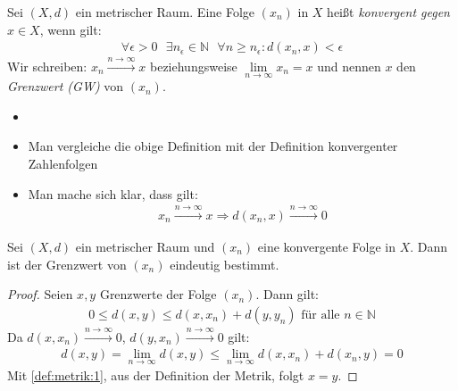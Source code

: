 
\begin{Definition}{%
	Sei $(X,d)$ ein metrischer Raum. Eine Folge $(x_n)$ in $X$ heißt 
	\emph{konvergent gegen} $x \in X$, wenn gilt:
	\begin{align*}
		\forall \epsilon > 0 \text{ } \exists n_\epsilon \in \mathbb{N} \text{ }
		\forall n \geq n_\epsilon : d(x_n, x) < \epsilon
	\end{align*}
	Wir schreiben: $x_n \overset{n\rightarrow \infty}{\longrightarrow} x$ 
	beziehungsweise $\lim\limits_{n \rightarrow \infty}{x_n} = x$ und nennen 
	$x$ den \emph{Grenzwert (GW)} von $(x_n)$. 
}\end{Definition}

\begin{Bemerkung}{
	\begin{itemize}
		\item[ ]
		\item Man vergleiche die obige Definition mit der Definition konvergenter 
		 Zahlenfolgen
		 \item Man mache sich klar, dass gilt:
		 \begin{align*}
		 	x_n \xrightarrow{n \rightarrow \infty} x \Longrightarrow 
		 	d(x_n, x) \xrightarrow{n \rightarrow \infty} 0
		 \end{align*}
	\end{itemize}
}\end{Bemerkung}

\begin{Lemma}{%
	Sei $(X,d)$ ein metrischer Raum und $(x_n)$ eine konvergente Folge in $X$. 
	Dann ist der Grenzwert von $(x_n)$ eindeutig bestimmt.
}\end{Lemma}

\begin{proof}
	Seien $x,y$ Grenzwerte der Folge $(x_n)$. Dann gilt:
	\begin{align*}
		0 \leq d (x,y) \leq d(x,x_n) + d(y, y_n) \text{ für alle } n \in \mathbb{N}
	\end{align*}
	Da $d(x,x_n) \overset{n \rightarrow \infty}{\longrightarrow} 0$, 
	$d(y, x_n) \overset{n \rightarrow \infty}{\longrightarrow} 0$ gilt:
	\begin{align*}
		d(x,y) = \lim\limits_{n \rightarrow \infty} d(x,y) \leq 
		\lim\limits_{n \rightarrow \infty} d(x,x_n) + d(x_n,y) = 0
	\end{align*}
	Mit \ref{def:metrik:1}, aus der Definition der Metrik, folgt $x = y$.
\end{proof}

